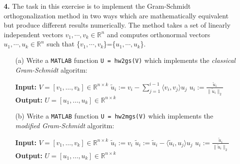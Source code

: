 \documentclass[10pt]{report}
\begin{document}
\begin{enumerate}


 \item[\textbf{4.}]
 The task in this exercise is to implement the Gram-Schmidt
  orthogonalization method in two ways which are mathematically equivalent but
  produce different results numerically. The method takes a set of linearly
  independent vectors $v_1,\cdots,v_k\in\mathbb{R}^n$ and computes
  orthonormal vectors $u_1,\cdots,u_k\in\mathbb{R}^n$ such that 
  \{$v_1,\cdots,v_k$\}=\{$u_1,\cdots,u_k$\}. 
  \begin{enumerate}

    \item[(a)] Write a \verb+MATLAB+ function \verb+U = hw2gs(V)+ which
    implements the \textit{classical Gram-Schmidt} algoritm:
    \begin{algorithmic}
    \State \textbf{Input:} $V=[v_1,\ldots,v_k]\in\mathbb{R}^{n\times k}$ 
    \State $\tilde{u}_i:=v_i-\sum_{j=1}^{i-1}\langle v_i,v_j\rangle u_j$ 
    \State $u_i:=\frac{\tilde{u}_i}{\|\tilde{u}_i\|_2}$
    \EndFor
    \State \textbf{Output:} $U=[u_1,\ldots,u_k]\in\mathbb{R}^{n\times k}$ 
    \end{algorithmic}

    \item[(b)] Write a \verb+MATLAB+ function \verb+U = hw2mgs(V)+ which
    implements the \textit{modified Gram-Schmidt} algoritm:
    \begin{algorithmic}
    \State \textbf{Input:} $V=[v_1,\ldots,v_k]\in\mathbb{R}^{n\times k}$ 
    \State $\tilde{u}_i:=v_i$
    \State $\tilde{u}_i:=\tilde{u}_i-\langle \tilde{u}_i,u_j\rangle u_j$ 
    \EndFor
    \State $u_i:=\frac{\tilde{u}_i}{\|\tilde{u}_i\|_2}$
    \EndFor
    \State \textbf{Output:} $U=[u_1,\ldots,u_k]\in\mathbb{R}^{n\times k}$ 
    \end{algorithmic}
          

\end{enumerate}
\end{enumerate}
\end{document}
